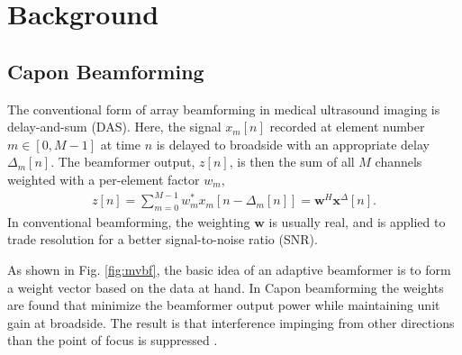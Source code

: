 \documentclass[conference]{IEEEtran}
\newcommand{\mat}[1]{\mathbf{#1}}
\renewcommand{\vec}[1]{\mathbf{#1}}
\begin{document}
\section{Background}
\subsection{Capon Beamforming}
The conventional form of array beamforming in medical ultrasound imaging is delay-and-sum (DAS). Here, the signal $x_m[n]$ recorded at element number $m \in [0,M-1]$ at time $n$ is delayed to broadside with an appropriate delay $\Delta_m[n]$. The beamformer output, $z[n]$, is then the sum of all $M$ channels weighted with a per-element factor $w_m$,
\begin{align}
z[n] = \sum_{m = 0}^{M-1}w_m^*x_m[n - \Delta_m[n]] = \vec{w}^H\vec{x}^{\Delta}[n]. \label{eq:z}
\end{align}
In conventional beamforming, the weighting $\vec{w}$ is usually real, and is applied to trade resolution for a better signal-to-noise ratio (SNR).

As shown in Fig. \ref{fig:mvbf}, the basic idea of an adaptive beamformer is to form a weight vector based on the data at hand.  In Capon beamforming the weights are found that minimize the beamformer output power while maintaining unit gain at broadside. The result is that interference impinging from other directions than the point of focus is suppressed \cite{Synnevag2007}.

\end{document}
